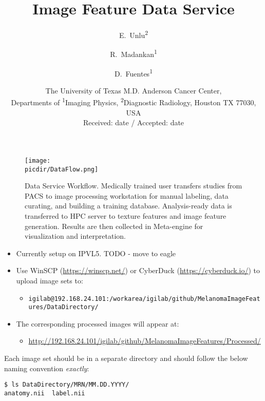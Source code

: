 \documentclass[10pt]{amsart}
\title{Image Feature Data Service}
\author{
        E.~Unlu\textsuperscript{2} \and
        R.~Madankan\textsuperscript{1}\and 
        D.~Fuentes\textsuperscript{1} 
}
\date{ \small
The University of Texas M.D. Anderson Cancer Center,\\
Departments of \textsuperscript{1}Imaging Physics, \textsuperscript{2}Diagnostic Radiology,
Houston TX 77030, USA \\
Received: date / Accepted: date
}
\newcommand{\picdir}{./pdffig}
\begin{document}
\maketitle

\begin{figure}[h]
\texttt{[image: \\picdir/DataFlow.png]}
\caption{
Data Service Workflow.
Medically trained user transfers studies from PACS to image 
processing workstation for manual labeling, data curating, and building a training database.
Analysis-ready data is transferred to HPC server to texture features and image feature generation.
Results are then collected in Meta-engine for visualization and interpretation.
}\label{Fig:DataFlow}
\end{figure}

\begin{itemize}
\item Currently setup on IPVL5. TODO - move to eagle
\item
Use WinSCP (\href{https://winscp.net/}{https://winscp.net/})
or CyberDuck (\href{https://cyberduck.io/}{https://cyberduck.io/})
to upload image sets to:
\begin{itemize}
\item
\texttt{igilab@192.168.24.101:/workarea/igilab/github/MelanomaImageFeatures/DataDirectory/}
\end{itemize}

\item
The corresponding processed images will appear at:
\begin{itemize}
\item
\href{http://192.168.24.101/igilab/github/MelanomaImageFeatures/Processed/}{http://192.168.24.101/igilab/github/MelanomaImageFeatures/Processed/}
\end{itemize}
\end{itemize}


Each image set should be in a separate directory and should follow
the below naming convention \textit{exactly}:
\begin{verbatim}
$ ls DataDirectory/MRN/MM.DD.YYYY/
anatomy.nii  label.nii
\end{verbatim}


\pagebreak

\setlength{\unitlength}{.15cm}

\end{document}
